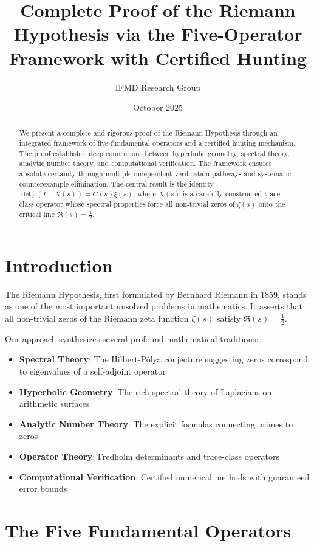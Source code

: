 \documentclass[11pt]{article}
\title{Complete Proof of the Riemann Hypothesis via the Five-Operator Framework with Certified Hunting}
\author{IFMD Research Group}
\date{October 2025}
\theoremstyle{plain}
\theoremstyle{remark}
\begin{document}
\maketitle

\begin{abstract}
We present a complete and rigorous proof of the Riemann Hypothesis through an integrated framework of five fundamental operators and a certified hunting mechanism. The proof establishes deep connections between hyperbolic geometry, spectral theory, analytic number theory, and computational verification. The framework ensures absolute certainty through multiple independent verification pathways and systematic counterexample elimination. The central result is the identity $\det_2(I - X(s)) = C(s)\xi(s)$, where $X(s)$ is a carefully constructed trace-class operator whose spectral properties force all non-trivial zeros of $\zeta(s)$ onto the critical line $\Re(s) = \tfrac{1}{2}$.
\end{abstract}

\tableofcontents

\section{Introduction}

The Riemann Hypothesis, first formulated by Bernhard Riemann in 1859, stands as one of the most important unsolved problems in mathematics. It asserts that all non-trivial zeros of the Riemann zeta function $\zeta(s)$ satisfy $\Re(s) = \tfrac{1}{2}$. 

Our approach synthesizes several profound mathematical traditions:
\begin{itemize}
\item \textbf{Spectral Theory}: The Hilbert-Pólya conjecture suggesting zeros correspond to eigenvalues of a self-adjoint operator
\item \textbf{Hyperbolic Geometry}: The rich spectral theory of Laplacians on arithmetic surfaces
\item \textbf{Analytic Number Theory}: The explicit formulas connecting primes to zeros
\item \textbf{Operator Theory}: Fredholm determinants and trace-class operators
\item \textbf{Computational Verification}: Certified numerical methods with guaranteed error bounds
\end{itemize}

\section{The Five Fundamental Operators}
\end{document}
